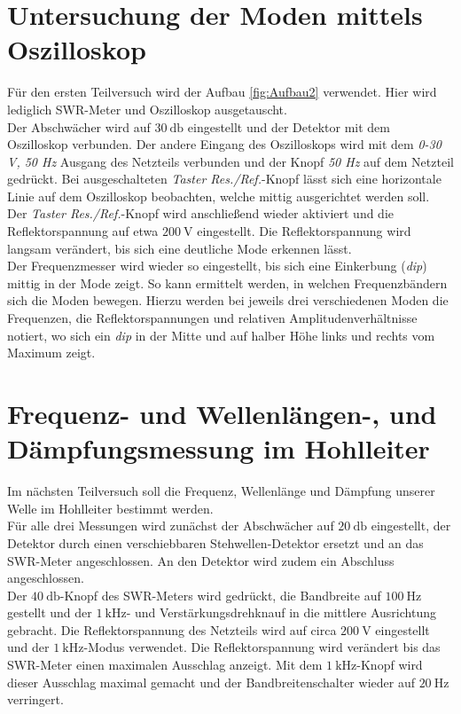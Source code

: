\section{Untersuchung der Moden mittels Oszilloskop}
Für den ersten Teilversuch wird der Aufbau \autoref{fig:Aufbau2} verwendet. Hier wird lediglich SWR-Meter und Oszilloskop ausgetauscht.\\
Der Abschwächer wird auf $\qty{30}{\decibel}$ eingestellt und der Detektor mit dem Oszilloskop verbunden. Der andere Eingang des Oszilloskops wird mit dem \textit{0-30 V, 50 Hz} Ausgang des Netzteils verbunden und der Knopf 
\textit{50 Hz} auf dem Netzteil gedrückt. Bei ausgeschalteten \textit{Taster Res./Ref.}-Knopf lässt sich eine horizontale Linie auf dem Oszilloskop beobachten, welche mittig ausgerichtet werden soll.\\
Der \textit{Taster Res./Ref.}-Knopf wird anschließend wieder aktiviert und die Reflektorspannung auf etwa $\qty{200}{\volt}$ eingestellt. Die Reflektorspannung wird langsam verändert, bis sich eine deutliche Mode erkennen lässt.\\
Der Frequenzmesser wird wieder so eingestellt, bis sich eine Einkerbung (\textit{dip}) mittig in der Mode zeigt. So kann ermittelt werden, in welchen Frequenzbändern sich die Moden bewegen. Hierzu werden bei jeweils drei verschiedenen
Moden die Frequenzen, die Reflektorspannungen und relativen Amplitudenverhältnisse notiert, wo sich ein \textit{dip} in der Mitte und auf halber Höhe links und rechts vom Maximum zeigt.

\section{Frequenz- und Wellenlängen-, und Dämpfungsmessung im Hohlleiter}
Im nächsten Teilversuch soll die Frequenz, Wellenlänge und Dämpfung unserer Welle im Hohlleiter bestimmt werden.\\
Für alle drei Messungen wird zunächst der Abschwächer auf $\qty{20}{\decibel}$ eingestellt, der Detektor durch einen verschiebbaren Stehwellen-Detektor ersetzt und an das SWR-Meter angeschlossen. An den Detektor
wird zudem ein Abschluss angeschlossen.\\
Der $\qty{40}{\decibel}$-Knopf des SWR-Meters wird gedrückt, die Bandbreite auf  $\qty{100}{\hertz}$ gestellt und der $\qty{1}{\kilo\hertz}$- und Verstärkungsdrehknauf in die mittlere Ausrichtung
gebracht. Die Reflektorspannung des Netzteils wird auf circa $\qty{200}{\volt}$ eingestellt und der $\qty{1}{\kilo\hertz}$-Modus verwendet. Die Reflektorspannung wird verändert bis das SWR-Meter einen 
maximalen Ausschlag anzeigt. Mit dem $\qty{1}{\kilo\hertz}$-Knopf wird dieser Ausschlag maximal gemacht und der Bandbreitenschalter wieder auf $\qty{20}{\hertz}$ verringert.


